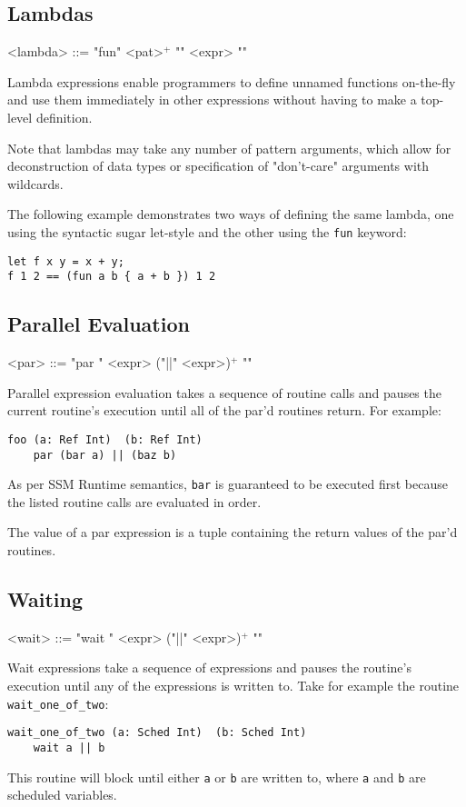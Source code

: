 \documentclass{article}
\begin{document}
\subsection{Lambdas}
\begin{grammar}
<lambda> ::= "fun" <pat>$^{+}$ "{" <expr> "}"
\end{grammar}

Lambda expressions enable programmers to define unnamed functions on-the-fly and use them immediately in other expressions without having to make a top-level definition.

Note that lambdas may take any number of pattern arguments, which allow for deconstruction of data types or specification of "don't-care" arguments with wildcards.

The following example demonstrates two ways of defining the same lambda, one using the syntactic sugar let-style and the other using the \texttt{fun} keyword:
\begin{lstlisting}
let f x y = x + y;
f 1 2 == (fun a b { a + b }) 1 2
\end{lstlisting}
\subsection{Parallel Evaluation}
\begin{grammar}
<par> ::= "par {" <expr> ("||" <expr>)$^{+}$ "}"
\end{grammar}
Parallel expression evaluation takes a sequence of routine calls and pauses the current routine's execution until all of the par'd routines return. For example:
\begin{lstlisting}
foo (a: Ref Int)  (b: Ref Int)
    par (bar a) || (baz b)
\end{lstlisting}
As per SSM Runtime semantics, \texttt{bar} is guaranteed to be executed first because the listed routine calls are evaluated in order.

The value of a par expression is a tuple containing the return values of the par'd routines.
\subsection{Waiting}
\begin{grammar}
<wait> ::= "wait {" <expr> ("||" <expr>)$^{+}$ "}"
\end{grammar}
Wait expressions take a sequence of expressions and pauses the routine's execution until any of the expressions is written to. Take for example the routine \texttt{wait_one_of_two}:
\begin{lstlisting}
wait_one_of_two (a: Sched Int)  (b: Sched Int)
    wait a || b
\end{lstlisting}
This routine will block until either \texttt{a} or \texttt{b} are written to, where \texttt{a} and  \texttt{b} are scheduled variables.
\end{document}
